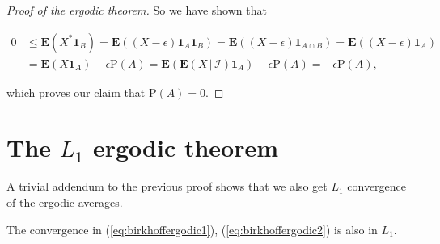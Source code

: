 \begin{proof}[Proof of the ergodic theorem]
\noindent So we have shown that

\begin{align*}
0 &\le \mathbf{E}(X^*\mathbf{1}_B) = \mathbf{E}((X-\epsilon)\mathbf{1}_A \mathbf{1}_B) =
\mathbf{E}((X-\epsilon)\mathbf{1}_{A\cap B} ) = \mathbf{E}((X-\epsilon)\mathbf{1}_A ) \\&=
\mathbf{E}(X\mathbf{1}_A) - \epsilon \mathrm{P}(A)
= \mathbf{E}(\mathbf{E}\left(X\,|\,\mathcal{I}\right)\mathbf{1}_A) - \epsilon \mathrm{P}(A) = -\epsilon \mathrm{P}(A),
\end{align*}

\noindent which proves our claim that $\mathrm{P}(A)=0$.
\end{proof}

\section{The $L_1$ ergodic theorem}
A trivial addendum to the previous proof shows that
we also get $L_1$ convergence of the ergodic
averages.

\begin{thm}
The convergence in (\ref{eq:birkhoffergodic1}),
(\ref{eq:birkhoffergodic2}) is also in $L_1$.
\end{thm}

